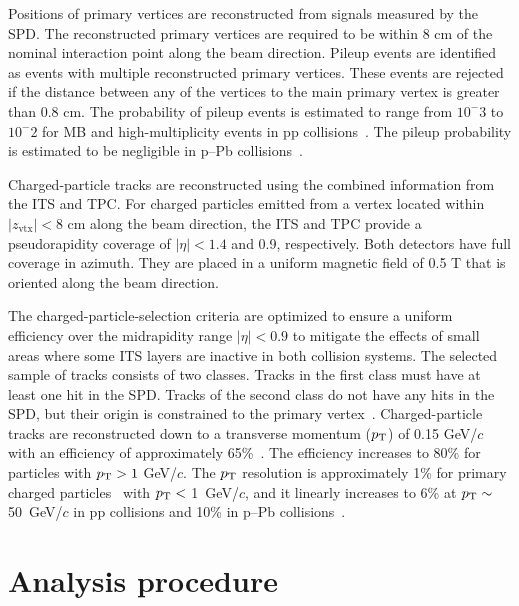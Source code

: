 Positions of primary vertices are reconstructed from signals measured by the SPD. The reconstructed primary vertices are required to be within 8 cm of the nominal interaction point along the beam direction. 
Pileup events are identified as events with multiple reconstructed primary vertices. These events are rejected if the distance between any of the vertices to the main primary vertex is greater than 0.8 cm.
The probability of pileup events is estimated to range from $10^-3$ to $10^-2$ for MB and high-multiplicity events in pp collisions~\cite{ALICE:2020swj}. The pileup probability is estimated to be negligible in p--Pb collisions~\cite{ALICE:2017svf}. 

Charged-particle tracks are reconstructed using the combined information from the ITS and TPC.
For charged particles emitted from a vertex located within $|z_\mathrm{vtx}|<8$ cm along the beam direction, the ITS and TPC provide a pseudorapidity coverage of $|\eta|<1.4$ and 0.9, respectively. Both detectors have full coverage in azimuth. They are placed in a uniform magnetic field of 0.5 T that is oriented along the beam direction.

The charged-particle-selection criteria are optimized to ensure a uniform efficiency over the midrapidity range $|\eta|<0.9$ to mitigate the effects of small areas where some ITS layers are inactive in both collision systems. The selected sample of tracks consists of two classes. Tracks in the first class must have at least one hit in the SPD. Tracks of the second class do not have any hits in the SPD, but their origin is constrained to the primary vertex~\cite{ALICE:2012eyl}. 
Charged-particle tracks are reconstructed down to a transverse momentum ($p_\mathrm{T}$) of 0.15 GeV/$c$ with an efficiency of approximately 65\%~\cite{Ivanov:2006yra}. The efficiency increases to 80\% for particles with $p_\mathrm{T}>1$ GeV/$c$. The $p_\mathrm{T}$ resolution is approximately 1\% for primary charged particles~\cite{ALICE-PUBLIC-2017-005} with $p_\mathrm{T}<$ 1~GeV/$c$, and it linearly increases to 6\% at $p_\mathrm{T}\sim$ 50~GeV/$c$ in pp collisions and 10\% in p--Pb collisions~\cite{ALICE:2018vuu}.


\section{Analysis procedure}
\label{sec:ana}
